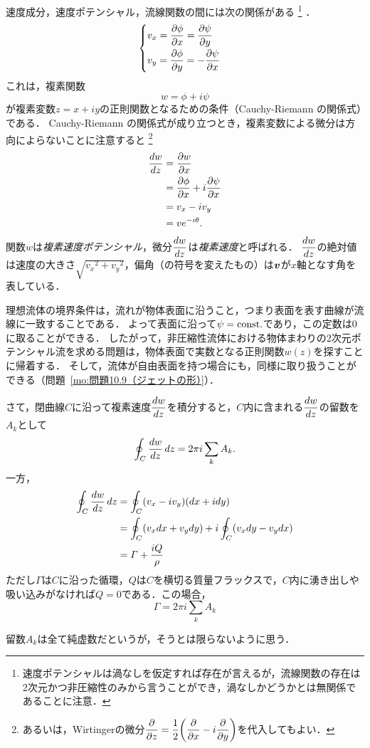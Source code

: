 速度成分，速度ポテンシャル，流線関数の間には次の関係がある
\footnote{速度ポテンシャルは渦なしを仮定すれば存在が言えるが，流線関数の存在は2次元かつ非圧縮性のみから言うことができ，渦なしかどうかとは無関係であることに注意．}
．
\[
    \begin{cases}
        v_x = \dpdv{\phi}{x} = \dpdv{\psi}{y} \\[7pt]
        v_y = \dpdv{\phi}{y} = -\dpdv{\psi}{x} \\
    \end{cases}
\]
これは，複素関数
\begin{equation}
    w = \phi + i\psi
\end{equation}
が複素変数$z=x+iy$の正則関数となるための条件（Cauchy-Riemann の関係式）である．
Cauchy-Riemann の関係式が成り立つとき，複素変数による微分は方向によらないことに注意すると
\footnote{
あるいは，Wirtingerの微分$\dpdv{z} = \dfrac{1}{2}\pqty{\dpdv{x}-i\dpdv{y}}$を代入してもよい．
}
\begin{align}
    \dv{w}{z} &= \pdv{w}{x} \notag \\
    &= \pdv{\phi}{x} + i \pdv{\psi}{x} \notag \\
    &= v_x - i v_y \\
    &= v e^{-i\theta}.
\end{align}
関数$w$は\emph{複素速度ポテンシャル}，微分$\ddv{w}{z}$は\emph{複素速度}と呼ばれる．
$\ddv{w}{z}$の絶対値は速度の大きさ$\sqrt{{v_x}^2+{v_y}^2}$，偏角（の符号を変えたもの）は$\vb*{v}$が$x$軸となす角を表している．



理想流体の境界条件は，流れが物体表面に沿うこと，つまり表面を表す曲線が流線に一致することである．
よって表面に沿って$\psi=\mathrm{const.}$であり，この定数は0に取ることができる．
したがって，非圧縮性流体における物体まわりの2次元ポテンシャル流を求める問題は，物体表面で実数となる正則関数$w(z)$を探すことに帰着する．
そして，流体が自由表面を持つ場合にも，同様に取り扱うことができる（問題~\ref{mo:問題10.9（ジェットの形）}）．


さて，閉曲線$C$に沿って複素速度$\ddv{w}{z}$を積分すると，$C$内に含まれる$\ddv{w}{z}$の留数を$A_k$として
\[
    \oint_C \dv{w}{z} \, dz = 2\pi i \sum_k A_k.
\]
一方，
\begin{align*}
    \oint_C \dv{w}{z} \, dz &= \oint_C (v_x-iv_y)(dx+idy) \\
    &= \oint_C (v_xdx + v_ydy) + i \oint_C (v_xdy-v_ydx) \\
    &= \varGamma + \frac{iQ}{\rho}
\end{align*}
ただし$\varGamma$は$C$に沿った循環，$Q$は$C$を横切る質量フラックスで，$C$内に湧き出しや吸い込みがなければ$Q=0$である．この場合，
\begin{equation}
    \varGamma = 2\pi i \sum_k A_k
\end{equation}
\begin{details}
留数$A_k$は全て純虚数だというが，そうとは限らないように思う．
\end{details}



